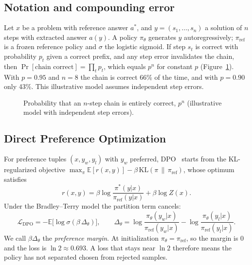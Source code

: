 \documentclass[11pt, a4paper]{article}
\begin{document}
\subsection{Notation and compounding error}
Let $x$ be a problem with reference answer $a^\ast$, and $y=(s_1,\dots,s_n)$ a solution of $n$ steps with extracted answer $a(y)$. A policy $\pi_\theta$ generates $y$ autoregressively; $\pi_{\text{ref}}$ is a frozen reference policy and $\sigma$ the logistic sigmoid. If step $s_t$ is correct with probability $p_t$ given a correct prefix, and any step error invalidates the chain, then $\Pr[\text{chain correct}]=\prod_t p_t$, which equals $p^{n}$ for constant $p$ (Figure~\ref{fig:compound}). With $p=0.95$ and $n=8$ the chain is correct 66\% of the time, and with $p=0.90$ only 43\%. This illustrative model assumes independent step errors.

\begin{figure}[t]
\centering
{}
\caption{Probability that an $n$-step chain is entirely correct, $p^{n}$ (illustrative model with independent step errors).}
\label{fig:compound}
\end{figure}

\subsection{Direct Preference Optimization}
For preference tuples $(x,y_w,y_l)$ with $y_w$ preferred, DPO~\cite{rafailov2023direct} starts from the KL-regularized objective $\max_{\pi}\mathbb{E}[r(x,y)]-\beta\,\mathrm{KL}(\pi\,\|\,\pi_{\text{ref}})$, whose optimum satisfies
\[ r(x,y)=\beta\log\frac{\pi^\ast(y|x)}{\pi_{\text{ref}}(y|x)}+\beta\log Z(x). \]
Under the Bradley--Terry model the partition term cancels:
\begin{equation}
\mathcal{L}_{\text{DPO}}=-\mathbb{E}\big[\log\sigma(\beta\,\Delta_\theta)\big],\qquad
\Delta_\theta=\log\frac{\pi_\theta(y_w|x)}{\pi_{\text{ref}}(y_w|x)}-\log\frac{\pi_\theta(y_l|x)}{\pi_{\text{ref}}(y_l|x)}.
\label{eq:dpo}
\end{equation}
We call $\beta\Delta_\theta$ the \emph{preference margin}. At initialization $\pi_\theta=\pi_{\text{ref}}$, so the margin is $0$ and the loss is $\ln 2\approx 0.693$. A loss that stays near $\ln 2$ therefore means the policy has not separated chosen from rejected samples.
\end{document}
